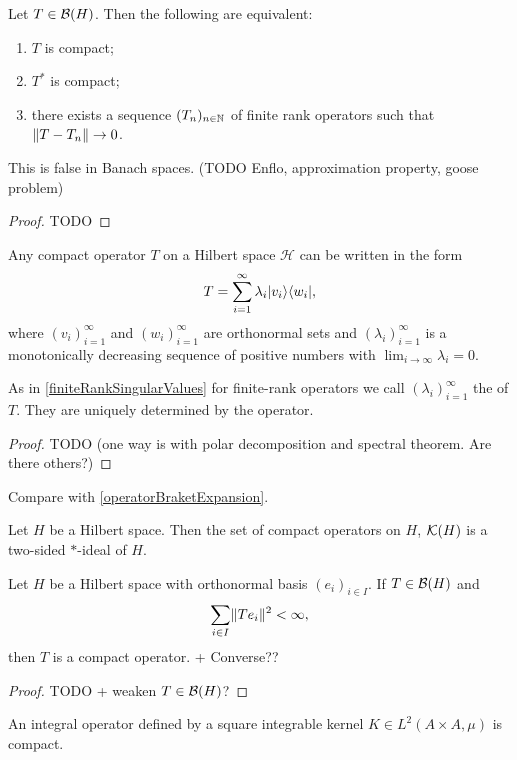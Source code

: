 \begin{proposition}
Let $T\in\operatorname{\mathcal{B}}(H)$. Then the following are equivalent:
\begin{enumerate}
\item $T$ is compact;
\item $T^*$ is compact;
\item there exists a sequence $(T_n)_{n\in\mathbb{N}}$ of finite rank operators such that $\lVert T-T_n\rVert\to 0$.
\end{enumerate}
\end{proposition}
This is false in Banach spaces. (TODO Enflo, approximation property, goose problem)
\begin{proof}
TODO
\end{proof}
\begin{corollary}
Any compact operator $T$ on a Hilbert space $\mathcal{H}$ can be written in the form
\[ T = \sum_{i=1}^\infty \lambda_i |v_i\rangle\langle w_i|, \]
where $(v_i)_{i=1}^\infty$ and $(w_i)_{i=1}^\infty$ are orthonormal sets and $(\lambda_i)_{i=1}^\infty$ is a monotonically decreasing sequence of positive numbers with $\lim_{i\to\infty}\lambda_i = 0$.
\end{corollary}
As in \ref{finiteRankSingularValues} for finite-rank operators we call $(\lambda_i)_{i=1}^\infty$ the  of $T$. They are uniquely determined by the operator.
\begin{proof}
TODO (one way is with polar decomposition and spectral theorem. Are there others?)
\end{proof}
Compare with \ref{operatorBraketExpansion}.

\begin{lemma}
Let $H$ be a Hilbert space. Then the set of compact operators on $H$, $\operatorname{\mathcal{K}}(H)$ is a two-sided $*$-ideal of $H$. 
\end{lemma}

\begin{proposition}
Let $H$ be a Hilbert space with orthonormal basis $(e_i)_{i\in I}$. If $T\in\operatorname{\mathcal{B}}(H)$ and
\[ \sum_{i\in I}\lVert Te_i\rVert^2  < \infty, \]
then $T$ is a compact operator. + Converse??
\end{proposition}
\begin{proof}
TODO + weaken $T\in\operatorname{\mathcal{B}}(H)$?
\end{proof}
\begin{corollary}
An integral operator defined by a square integrable kernel $K\in L^2(A\times A, \mu)$ is compact.
\end{corollary}

